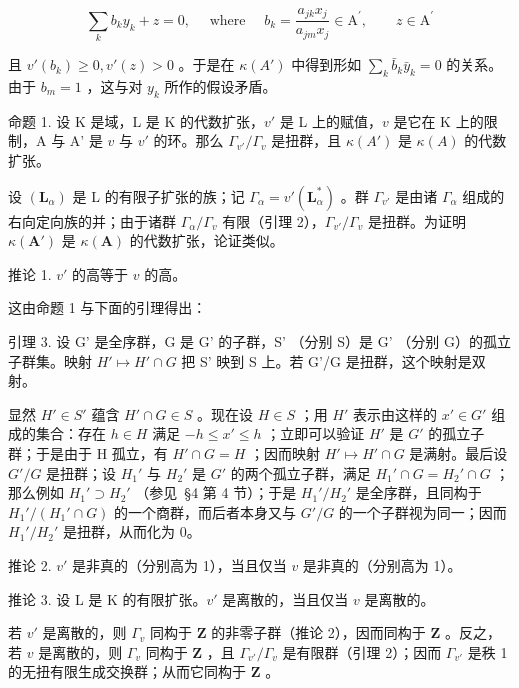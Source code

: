 \[
\sum_ {k} b _ {k} y _ {k} + z = 0, \quad \text { where } \quad b _ {k} = \frac {a _ {j k} x _ {j}}{a _ {j m} x _ {j}} \in \mathrm{A} ^ {\prime}, \qquad z \in \mathrm{A} ^ {\prime}
\]

且 \(v'(b_k) \geqslant 0, v'(z) > 0\) 。于是在 \(\kappa(A')\) 中得到形如 \(\sum_{k} \bar{b}_k \bar{y}_k = 0\) 的关系。由于 \(b_m = 1\) ，这与对 \(y_k\) 所作的假设矛盾。

命题 1. 设 K 是域，L 是 K 的代数扩张，\(v'\) 是 L 上的赋值，\(v\) 是它在 K 上的限制，A 与 A' 是 \(v\) 与 \(v'\) 的环。那么 \(\Gamma_{v'} / \Gamma_v\) 是扭群，且 \(\kappa(A')\) 是 \(\kappa(A)\) 的代数扩张。

设 \((\mathbf{L}_{\alpha})\) 是 L 的有限子扩张的族；记 \(\Gamma_{\alpha} = v'(\mathbf{L}_{\alpha}^{*})\) 。群 \(\Gamma_{v'}\) 是由诸 \(\Gamma_{\alpha}\) 组成的右向定向族的并；由于诸群 \(\Gamma_{\alpha}/\Gamma_{v}\) 有限（引理 2），\(\Gamma_{v'}/\Gamma_{v}\) 是扭群。为证明 \(\kappa(\mathbf{A}')\) 是 \(\kappa(\mathbf{A})\) 的代数扩张，论证类似。

推论 1. \(v'\) 的高等于 \(v\) 的高。

这由命题 1 与下面的引理得出：

引理 3. 设 G' 是全序群，G 是 G' 的子群，S' （分别 S）是 G' （分别 G）的孤立子群集。映射 \(H' \mapsto H' \cap G\) 把 S' 映到 S 上。若 G'/G 是扭群，这个映射是双射。

显然 \(H' \in S'\) 蕴含 \(H' \cap G \in S\) 。现在设 \(H \in S\) ；用 \(H'\) 表示由这样的 \(x' \in G'\) 组成的集合：存在 \(h \in H\) 满足 \(-h \leqslant x' \leqslant h\) ；立即可以验证 \(H'\) 是 \(G'\) 的孤立子群；于是由于 H 孤立，有 \(H' \cap G = H\) ；因而映射 \(H' \mapsto H' \cap G\) 是满射。最后设 \(G'/G\) 是扭群；设 \(H_1'\) 与 \(H_2'\) 是 \(G'\) 的两个孤立子群，满足 \(H_1' \cap G = H_2' \cap G\) ；那么例如 \(H_1' \supset H_2'\) （参见~§4 第 4 节）；于是 \(H_1'/H_2'\) 是全序群，且同构于 \(H_1'/(H_1' \cap G)\) 的一个商群，而后者本身又与 \(G'/G\) 的一个子群视为同一；因而 \(H_1'/H_2'\) 是扭群，从而化为 0。

推论 2. \(v'\) 是非真的（分别高为 1），当且仅当 \(v\) 是非真的（分别高为 1）。

推论 3. 设 L 是 K 的有限扩张。\(v'\) 是离散的，当且仅当 \(v\) 是离散的。

若 \(v'\) 是离散的，则 \(\Gamma_v\) 同构于 \(\mathbf{Z}\) 的非零子群（推论 2），因而同构于 \(\mathbf{Z}\) 。反之，若 \(v\) 是离散的，则 \(\Gamma_v\) 同构于 \(\mathbf{Z}\) ，且 \(\Gamma_{v'} / \Gamma_v\) 是有限群（引理 2）；因而 \(\Gamma_{v'}\) 是秩 1 的无扭有限生成交换群；从而它同构于 \(\mathbf{Z}\) 。

